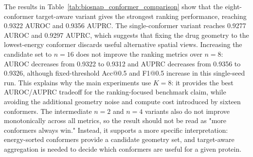 \begin{table}[!htbp]
\caption{Single-seed conformer-count comparison on BioSNAP. Conformers are energy-sorted during preprocessing; $n=1$ keeps the lowest-energy conformer only, while larger $n$ values expose additional geometries.}
\label{tab:biosnap_conformer_comparison}
\begin{center}
\scriptsize
\setlength{\tabcolsep}{3.2pt}
\end{center}
\end{table}

The results in Table~\ref{tab:biosnap_conformer_comparison} show that the eight-conformer target-aware variant gives the strongest ranking performance, reaching 0.9322 AUROC and 0.9356 AUPRC. The single-conformer variant reaches 0.9277 AUROC and 0.9297 AUPRC, which suggests that fixing the drug geometry to the lowest-energy conformer discards useful alternative spatial views. Increasing the candidate set to $n=16$ does not improve the ranking metrics over $n=8$: AUROC decreases from 0.9322 to 0.9312 and AUPRC decreases from 0.9356 to 0.9326, although fixed-threshold Acc@0.5 and F1@0.5 increase in this single-seed run. This explains why the main experiments use $K=8$: it provides the best AUROC/AUPRC tradeoff for the ranking-focused benchmark claim, while avoiding the additional geometry noise and compute cost introduced by sixteen conformers. The intermediate $n=2$ and $n=4$ variants also do not improve monotonically across all metrics, so the result should not be read as "more conformers always win." Instead, it supports a more specific interpretation: energy-sorted conformers provide a candidate geometry set, and target-aware aggregation is needed to decide which conformers are useful for a given protein.

